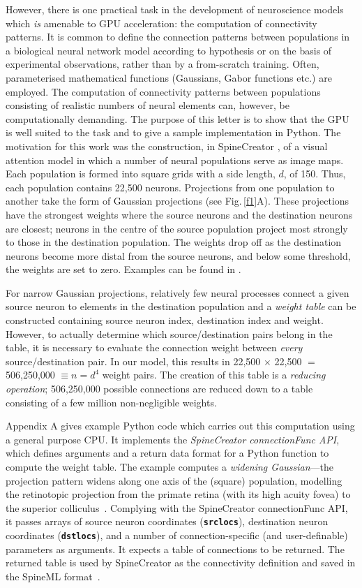 \documentclass[12pt, a4paper]{article}
\newcommand{\code}[1]{\textbf{\texttt{#1}}}
\begin{document}
However, there is one practical task in the development of neuroscience models
which \emph{is} amenable to GPU acceleration: the computation of connectivity
patterns. It is common to define the connection patterns between populations
in a biological neural network model according to hypothesis or on the basis
of experimental observations, rather than by a from-scratch training. Often,
parameterised mathematical functions (Gaussians, Gabor functions etc.) are
employed. The computation of connectivity patterns between populations
consisting of realistic numbers of neural elements can, however, be
computationally demanding. The purpose of this letter is to show that the GPU
is well suited to the task and to give a sample implementation in Python. The
motivation for this work was the construction, in
SpineCreator \cite{cope_spinecreator_2015,cope_spinecreator:_2016}, of a
visual attention model in which a number of neural populations serve as image
maps. Each population is formed into square grids with a side length, $d$, of
150. Thus, each population contains 22,500 neurons. Projections from one
population to another take the form of Gaussian projections (see
Fig.\,\ref{f1}A). These projections have the strongest weights where the
source neurons and the destination neurons are closest; neurons in the centre
of the source population project most strongly to those in the destination
population. The weights drop off as the destination neurons become more distal
from the source neurons, and below some threshold, the weights are set to
zero. Examples can be found in \cite{james_integrating_2018}.

For narrow Gaussian projections, relatively few neural processes connect a
given source neuron to elements in the destination population and
a \emph{weight table} can be constructed containing source neuron index,
destination index and weight. However, to actually determine which
source/destination pairs belong in the table, it is necessary to evaluate the
connection weight between \emph{every} source/destination pair. In our model,
this results in 22,500 $\times$ 22,500 $=$ 506,250,000 $\equiv n = d^4$ weight
pairs.  The creation of this table is a \emph{reducing operation}; 506,250,000
possible connections are reduced down to a table consisting of a few
million non-negligible weights.

Appendix A gives example Python code which carries out this computation using
a general purpose CPU. It implements the \emph{SpineCreator connectionFunc
API}, which defines arguments and a return data format for a Python function
to compute the weight table. The example computes a \emph{widening
Gaussian}---the projection pattern widens along one axis of the (square)
population, modelling the retinotopic projection from the primate retina (with
its high acuity fovea) to the superior
colliculus~\cite{james_integrating_2018}. Complying with the SpineCreator
connectionFunc API, it passes arrays of source neuron coordinates
(\code{srclocs}), destination neuron coordinates (\code{dstlocs}), and a
number of connection-specific (and user-definable) parameters as arguments. It
expects a table of connections to be returned. The returned table is used by
SpineCreator as the connectivity definition and saved in the SpineML
format~\cite{cope_spineml_2014}.
\end{document}
